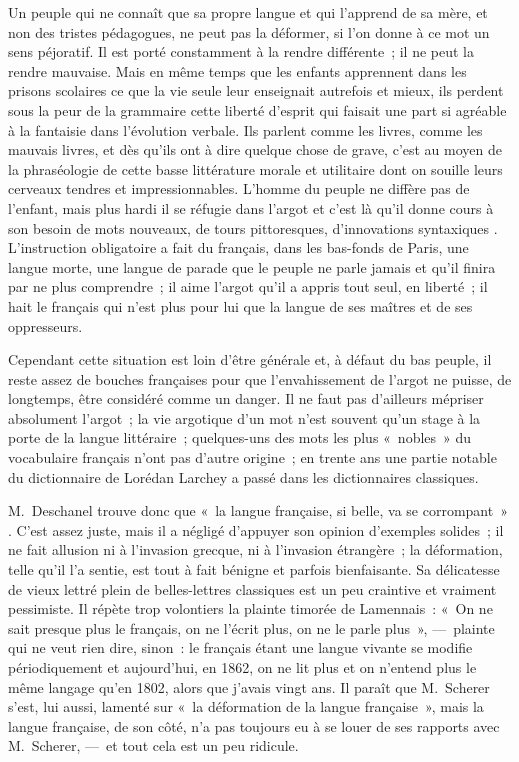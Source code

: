\documentclass[french,twoside]{book} %
\begin{document}
Un peuple qui ne connaît que sa propre langue et qui l’apprend de sa mère, et non des tristes pédagogues, ne peut pas la déformer, si l’on donne à ce mot un sens péjoratif. Il est porté constamment à la rendre différente ; il ne peut la rendre mauvaise. Mais en même temps que les enfants apprennent dans les prisons scolaires ce que la vie seule leur enseignait autrefois et mieux, ils perdent sous la peur de la grammaire cette liberté d’esprit qui faisait une part si agréable à la fantaisie dans l’évolution verbale. Ils parlent comme les livres, comme les mauvais livres, et dès qu’ils ont à dire quelque chose de grave, c’est au moyen de la phraséologie de cette basse littérature morale et utilitaire dont on souille leurs cerveaux tendres et impressionnables. L’homme du peuple ne diffère pas de l’enfant, mais plus hardi il se réfugie dans l’argot et c’est là qu’il donne cours à son besoin de mots nouveaux, de tours pittoresques, d’innovations syntaxiques . L’instruction obligatoire a fait du français, dans les bas-fonds de Paris, une langue morte, une langue de parade que le peuple ne parle jamais et qu’il finira par ne plus comprendre ; il aime l’argot qu’il a appris tout seul, en liberté ; il hait le français qui n’est plus pour lui que la langue de ses maîtres et de ses oppresseurs.\par
Cependant cette situation est loin d’être générale et, à défaut du bas peuple, il reste assez de bouches françaises pour que l’envahissement de l’argot ne puisse, de longtemps, être considéré comme un danger. Il ne faut pas d’ailleurs mépriser absolument l’argot ; la vie argotique d’un mot n’est souvent qu’un stage à la porte de la langue littéraire ; quelques-uns des mots les plus « nobles » du vocabulaire français n’ont pas d’autre origine ; en trente ans une partie notable du dictionnaire de Lorédan Larchey a passé dans les dictionnaires classiques.\par
M. Deschanel trouve donc que « la langue française, si belle, va se corrompant » . C’est assez juste, mais il a négligé d’appuyer son opinion d’exemples solides ; il ne fait allusion ni à l’invasion grecque, ni à l’invasion étrangère ; la déformation, telle qu’il l’a sentie, est tout à fait bénigne et parfois bienfaisante. Sa délicatesse de vieux lettré plein de belles-lettres classiques est un peu craintive et vraiment pessimiste. Il répète trop volontiers la plainte timorée de Lamennais : « On ne sait presque plus le français, on ne l’écrit plus, on ne le parle plus », — plainte qui ne veut rien dire, sinon : le français étant une langue vivante se modifie périodiquement et aujourd’hui, en 1862, on ne lit plus et on n’entend plus le même langage qu’en 1802, alors que j’avais vingt ans. Il paraît que M. Scherer s’est, lui aussi, lamenté sur « la déformation de la langue française », mais la langue française, de son côté, n’a pas toujours eu à se louer de ses rapports avec M. Scherer, — et tout cela est un peu ridicule.\par
\end{document}
